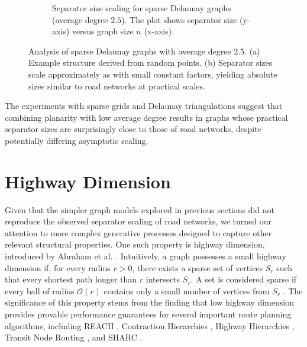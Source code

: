 \begin{figure}
\begin{subfigure}{0.55\linewidth}
		\caption{Separator size scaling for sparse Delaunay graphs (average degree \(2.5\)). The plot shows separator size (y-axis) versus graph size \(n\) (x-axis).}
		\label{fig:sparse_delaunay_sep_plot} %
	\end{subfigure}
	\caption{Analysis of sparse Delaunay graphs with average degree \(2.5\). (a) Example structure derived from random points. (b) Separator sizes scale approximately as  with small constant factors, yielding absolute sizes similar to road networks at practical scales.}
	\label{fig:sparse_delaunay_separators} %
\end{figure}

The experiments with sparse grids and Delaunay triangulations suggest that combining planarity with low average degree results in graphs whose practical separator sizes are surprisingly close to those of road networks, despite potentially differing asymptotic scaling.

\section{Highway Dimension}
\label{sec:synthetic:highway_dimension}

Given that the simpler graph models explored in previous sections did not reproduce the observed  separator scaling of road networks, we turned our attention to more complex generative processes designed to capture other relevant structural properties.
One such property is highway dimension, introduced by Abraham et al. \cite{abraham_highway_2010}.
Intuitively, a graph possesses a small highway dimension if, for every radius \(r > 0\), there exists a sparse set of vertices \(S_r\) such that every shortest path longer than \(r\) intersects \(S_r\).
A set is considered sparse if every ball of radius \(\mathcal{O}(r)\) contains only a small number of vertices from \(S_r\) \cite{abraham_highway_2010}.
The significance of this property stems from the finding that low highway dimension provides provable performance guarantees for several important route planning algorithms, including REACH \cite{goldberg_reach_2006}, Contraction Hierarchies \cite{geisberger_contraction_2008}, Highway Hierarchies \cite{sanders_highway_2005}, Transit Node Routing \cite{bast_fast_2007}, and SHARC \cite{bauer_sharc_2010}.

